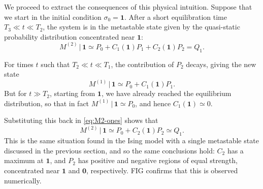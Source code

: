 \documentclass[10pt]{article}
\newcommand{\zeros}{\mathbf{0}}
\newcommand{\ones}{\mathbf{1}}
\newcommand{\twos}{\mathbf{2}}
\newcommand{\given}{\, | \,}
\newcommand{\M}[1]{M^{(#1)}}
\begin{document}
%
We proceed to extract the consequences of this physical
intuition.
Suppose that we start in the initial condition $\sigma_0 =
\ones$. After a short equilibration time  $T_3 \ll t \ll T_2$, the system is in the
metastable state given by the quasi-static
probability distribution  concentrated near $\ones$:
\begin{equation}
 \M{2} \given \ones \simeq P_0 + C_1(\ones) P_1 + C_2(\ones) P_2 = Q_1.
 \label{eq:M2-ones}
\end{equation}

For times $t$ such that $T_2 \ll t \ll T_1$, the contribution of $P_2$ 
decays, giving the new state
\begin{equation}
 \M{1} \given \ones \simeq P_0 + C_1(\ones) P_1.
\end{equation}
But for $t \gg T_2$, starting from $\ones$, we have already reached the
equilibrium distribution, so that in fact $\M{1} \given \ones \simeq P_0$, and
hence $C_1(\ones) \simeq 0$. 

Substituting this back in \eqref{eq:M2-ones} shows that
\begin{equation}
 \M{2} \given \ones \simeq P_0 + C_2(\ones) P_2 \simeq Q_1.
\end{equation}
This is the same situation found in the Ising model with a single metastable state discussed in the previous section, and so the same conclusions hold: $C_2$ has a maximum at $\ones$, and $P_2$ has positive and negative regions of equal strength, concentrated near $\ones$ and $\zeros$, respectively.  FIG confirms that this is observed numerically.
% 
% 
\end{document}
